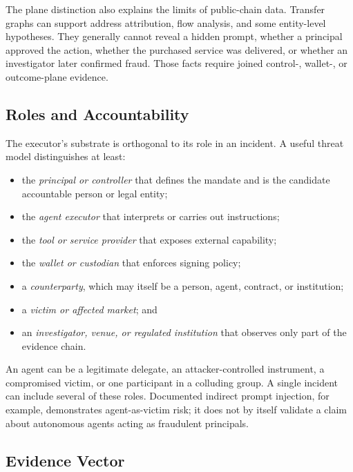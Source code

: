 The plane distinction also explains the limits of public-chain data.  Transfer
graphs can support address attribution, flow analysis, and some entity-level
hypotheses\cite{meiklejohn2016,chen2020}.  They generally cannot reveal a hidden
prompt, whether a principal approved the action, whether the purchased service
was delivered, or whether an investigator later confirmed fraud.  Those facts
require joined control-, wallet-, or outcome-plane evidence.

\subsection{Roles and Accountability}

The executor's substrate is orthogonal to its role in an incident.  A useful
threat model distinguishes at least:
\begin{itemize}[leftmargin=*,nosep]
  \item the \emph{principal or controller} that defines the mandate and is the
    candidate accountable person or legal entity;
  \item the \emph{agent executor} that interprets or carries out instructions;
  \item the \emph{tool or service provider} that exposes external capability;
  \item the \emph{wallet or custodian} that enforces signing policy;
  \item a \emph{counterparty}, which may itself be a person, agent, contract, or
    institution;
  \item a \emph{victim or affected market}; and
  \item an \emph{investigator, venue, or regulated institution} that observes
    only part of the evidence chain.
\end{itemize}

An agent can be a legitimate delegate, an attacker-controlled instrument, a
compromised victim, or one participant in a colluding group.  A single incident
can include several of these roles.  Documented indirect prompt injection, for
example, demonstrates agent-as-victim risk\cite{greshake2023,grokbankr2026}; it
does not by itself validate a claim about autonomous agents acting as fraudulent
principals.

\subsection{Evidence Vector}

